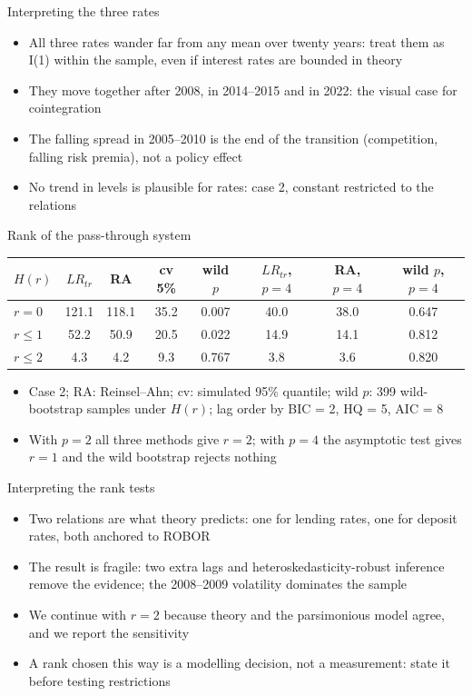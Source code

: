 \begin{frame}{Interpreting the three rates}
\itemsize{\small}
\begin{itemize}
    \item All three rates wander far from any mean over twenty years: treat them as I(1) within the sample, even if interest rates are bounded in theory
    \item They move together after 2008, in 2014--2015 and in 2022: the visual case for cointegration
    \item The falling spread in 2005--2010 is the end of the transition (competition, falling risk premia), not a policy effect
    \item No trend in levels is plausible for rates: case 2, constant restricted to the relations
\end{itemize}
\end{frame}

\begin{frame}{Rank of the pass-through system}
\itemsize{\small}
\begin{center}
\scriptsize
\begin{tabular}{lccccccc}
\toprule
$H(r)$ & $LR_{tr}$ & RA & cv 5\% & wild $p$ & $LR_{tr}$, $p{=}4$ & RA, $p{=}4$ & wild $p$, $p{=}4$ \\
\midrule
$r = 0$ & 121.1 & 118.1 & 35.2 & 0.007 & 40.0 & 38.0 & 0.647 \\
$r \le 1$ & 52.2 & 50.9 & 20.5 & 0.022 & 14.9 & 14.1 & 0.812 \\
$r \le 2$ & 4.3 & 4.2 & 9.3 & 0.767 & 3.8 & 3.6 & 0.820 \\
\bottomrule
\end{tabular}
\end{center}
\begin{itemize}
    \item Case 2; RA: Reinsel--Ahn; cv: simulated 95\% quantile; wild $p$: 399 wild-bootstrap samples under $H(r)$; lag order by BIC = 2, HQ = 5, AIC = 8
    \item With $p = 2$ all three methods give $r = 2$; with $p = 4$ the asymptotic test gives $r = 1$ and the wild bootstrap rejects nothing
\end{itemize}
\end{frame}

\begin{frame}{Interpreting the rank tests}
\itemsize{\small}
\begin{itemize}
    \item Two relations are what theory predicts: one for lending rates, one for deposit rates, both anchored to ROBOR
    \item The result is fragile: two extra lags and heteroskedasticity-robust inference remove the evidence; the 2008--2009 volatility dominates the sample
    \item We continue with $r = 2$ because theory and the parsimonious model agree, and we report the sensitivity
    \item A rank chosen this way is a modelling decision, not a measurement: state it before testing restrictions
\end{itemize}
\end{frame}

